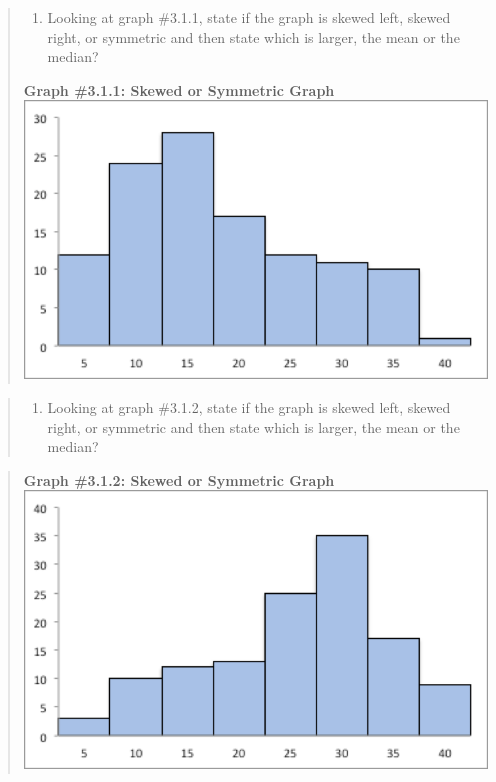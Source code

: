 \documentclass[]{book}
\providecommand{\tightlist}{%
  \setlength{\itemsep}{0pt}\setlength{\parskip}{0pt}}
\begin{document}
\begin{quote}
\begin{enumerate}
\def\labelenumi{\arabic{enumi}.}
\setcounter{enumi}{4}
\tightlist
\item
  Looking at graph \#3.1.1, state if the graph is skewed left, skewed right, or symmetric and then state which is larger, the mean or the median?
\end{enumerate}

\textbf{Graph \#3.1.1: Skewed or Symmetric Graph}
\includegraphics{graph_3_1_1.png}
\end{quote}

\begin{quote}
\begin{enumerate}
\def\labelenumi{\arabic{enumi}.}
\setcounter{enumi}{5}
\tightlist
\item
  Looking at graph \#3.1.2, state if the graph is skewed left, skewed right, or symmetric and then state which is larger, the mean or the median?
\end{enumerate}
\end{quote}

\begin{quote}
\textbf{Graph \#3.1.2: Skewed or Symmetric Graph}
\includegraphics{graph_3_1_2.png}
\end{quote}
\end{document}
